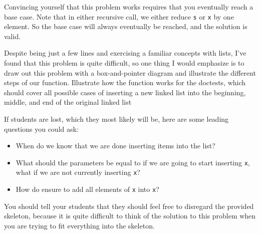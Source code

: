 \begin{solution}[0.6in]
    Convincing yourself that this problem works requires that you eventually reach a base case. Note that in either recursive call, we either reduce \lstinline{s} or \lstinline{x} by one element. So the base case will always eventually be reached, and the solution is valid. 
\end{solution}

\begin{questionmeta}
    Despite being just a few lines and exercising a familiar concepts with lists, I've found that this problem is quite difficult, so one thing I would emphasize is to draw out this problem with a box-and-pointer diagram and illustrate the different steps of our function. Illustrate how the function works for the doctests, which should cover all possible cases of inserting a new linked list into the beginning, middle, and end of the original linked list
    
    If students are lost, which they most likely will be, here are some leading questions you could ask: 
    \begin{itemize}
        \item When do we know that we are done inserting items into the list?
        \item What should the parameters be equal to if we are going to start inserting \lstinline{x}, what if we are not currently inserting \lstinline{x}?
        \item How do ensure to add all elements of \lstinline{x} into \lstinline{x}?
    \end{itemize}
    
    You should tell your students that they should feel free to disregard the provided skeleton, because it is quite difficult to think of the solution to this problem when you are trying to fit everything into the skeleton. 
    \end{questionmeta}
    
    